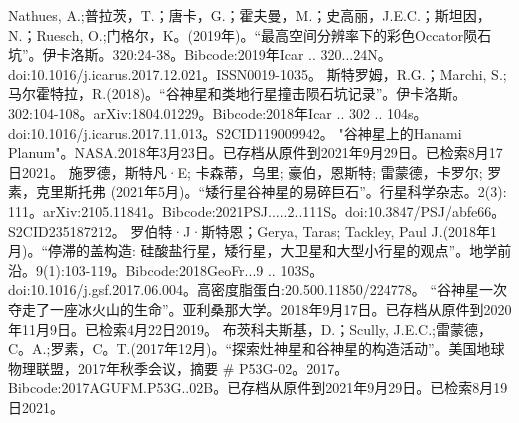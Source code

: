 \begin{enumerate}
 Nathues, A.;普拉茨，T.；唐卡，G.；霍夫曼，M.；史高丽，J.E.C.；斯坦因，N.；Ruesch, O.;门格尔，K。(2019年)。“最高空间分辨率下的彩色Occator陨石坑”。伊卡洛斯。320:24-38。Bibcode:2019年Icar .. 320...24N。doi:10.1016/j.icarus.2017.12.021。ISSN0019-1035。 
 斯特罗姆，R.G.；Marchi, S.;马尔霍特拉，R.(2018)。“谷神星和类地行星撞击陨石坑记录”。伊卡洛斯。302:104-108。arXiv:1804.01229。Bibcode:2018年Icar .. 302 .. 104s。doi:10.1016/j.icarus.2017.11.013。S2CID119009942。 
 "谷神星上的Hanami Planum"。NASA.2018年3月23日。已存档从原件到2021年9月29日。已检索8月17日2021。
 施罗德，斯特凡·E; 卡森蒂，乌里; 豪伯，恩斯特; 雷蒙德，卡罗尔; 罗素，克里斯托弗 (2021年5月)。“矮行星谷神星的易碎巨石”。行星科学杂志。2(3): 111。arXiv:2105.11841。Bibcode:2021PSJ.....2..111S。doi:10.3847/PSJ/abfe66。S2CID235187212。 
 罗伯特·J·斯特恩；Gerya, Taras; Tackley, Paul J.(2018年1月)。“停滞的盖构造: 硅酸盐行星，矮行星，大卫星和大型小行星的观点”。地学前沿。9(1):103-119。Bibcode:2018GeoFr...9 .. 103S。doi:10.1016/j.gsf.2017.06.004。高密度脂蛋白:20.500.11850/224778。
 “谷神星一次夺走了一座冰火山的生命”。亚利桑那大学。2018年9月17日。已存档从原件到2020年11月9日。已检索4月22日2019。
 布茨科夫斯基，D.；Scully, J.E.C.;雷蒙德，C。A.;罗素，C。T.(2017年12月)。“探索灶神星和谷神星的构造活动”。美国地球物理联盟，2017年秋季会议，摘要 # P53G-02。2017。Bibcode:2017AGUFM.P53G..02B。已存档从原件到2021年9月29日。已检索8月19日2021。
\end{enumerate}